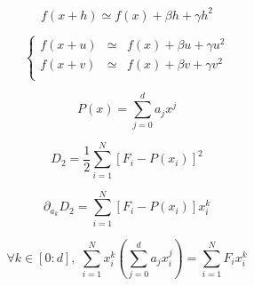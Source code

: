 \documentclass[aps,12pt]{revtex4}
\begin{document}
\begin{equation}
	f(x+h) \simeq f(x) + \beta h + \gamma h^2 
\end{equation}

\begin{equation}
\left\lbrace
\begin{array}{rcl}
	f(x+u) &\simeq & f(x) + \beta u + \gamma u^2  \\
	f(x+v) &\simeq & f(x) + \beta v + \gamma v^2  \\
\end{array}
\right.
\end{equation}

\begin{equation}
	P(x) = \sum_{j=0}^{d} a_j x^j
\end{equation}
	 
\begin{equation}
	D_2 = \dfrac{1}{2}\sum_{i=1}^N \left[F_i - P(x_i)\right]^2
\end{equation}

\begin{equation}
	\partial_{a_k} D_2 = \sum_{i=1}^N \left[F_i - P(x_i)\right] x_i^k
\end{equation}

\begin{equation}
\forall k \in [0:d], \; \sum_{i=1}^N x_i^k \left( \sum_{j=0}^{d} a_j x_i^j\right)= \sum_{i=1}^N F_i x_i ^k
\end{equation}
\end{document}
